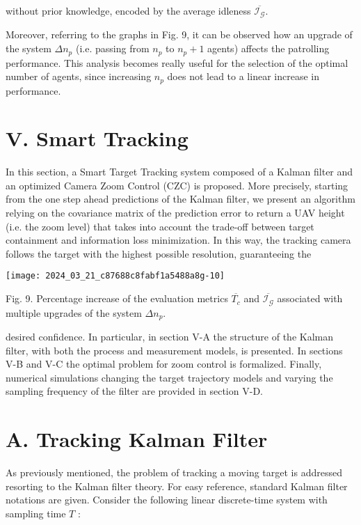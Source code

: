 \documentclass[conference]{IEEEtran}
\begin{document}
without prior knowledge, encoded by the average idleness $\overline{\mathcal{I}_{\mathcal{G}}}$.

Moreover, referring to the graphs in Fig. 9, it can be observed how an upgrade of the system $\Delta n_{p}$ (i.e. passing from $n_{p}$ to $n_{p}+1$ agents) affects the patrolling performance. This analysis becomes really useful for the selection of the optimal number of agents, since increasing $n_{p}$ does not lead to a linear increase in performance.

\section*{V. Smart Tracking}
In this section, a Smart Target Tracking system composed of a Kalman filter and an optimized Camera Zoom Control (CZC) is proposed. More precisely, starting from the one step ahead predictions of the Kalman filter, we present an algorithm relying on the covariance matrix of the prediction error to return a UAV height (i.e. the zoom level) that takes into account the trade-off between target containment and information loss minimization. In this way, the tracking camera follows the target with the highest possible resolution, guaranteeing the

\begin{center}
\texttt{[image: 2024\_03\_21\_c87688c8fabf1a5488a8g-10]}
\end{center}

Fig. 9. Percentage increase of the evaluation metrics $\overline{T_{c}}$ and $\overline{\mathcal{I}_{\mathcal{G}}}$ associated with multiple upgrades of the system $\Delta n_{p}$.

desired confidence. In particular, in section V-A the structure of the Kalman filter, with both the process and measurement models, is presented. In sections V-B and V-C the optimal problem for zoom control is formalized. Finally, numerical simulations changing the target trajectory models and varying the sampling frequency of the filter are provided in section $\mathrm{V}$-D.

\section*{A. Tracking Kalman Filter}
As previously mentioned, the problem of tracking a moving target is addressed resorting to the Kalman filter theory. For easy reference, standard Kalman filter notations are given. Consider the following linear discrete-time system with sampling time $T$ :
\end{document}
